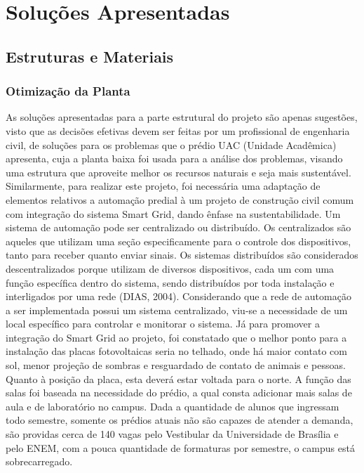\part{Soluções Apresentadas}
\label{sol}
\chapter[Estruturas e Materiais]{Estruturas e Materiais}

\section{Otimização da Planta}

As soluções apresentadas para a parte estrutural do projeto são apenas sugestões, visto que as decisões efetivas devem ser feitas por um profissional de engenharia civil, de soluções para os problemas que o prédio UAC (Unidade Acadêmica) apresenta, cuja a planta baixa foi usada para a análise dos problemas, visando uma estrutura que aproveite melhor os recursos naturais e seja mais sustentável.
Similarmente, para realizar este projeto, foi necessária uma adaptação de elementos relativos a automação predial à um projeto de construção civil comum com integração do sistema Smart Grid, dando ênfase na sustentabilidade. Um sistema de automação pode ser centralizado ou distribuído. Os centralizados são aqueles que utilizam uma seção especificamente para o controle dos dispositivos, tanto para receber quanto enviar sinais. Os sistemas distribuídos são considerados descentralizados porque utilizam de diversos dispositivos, cada um com uma função específica dentro do sistema, sendo distribuídos por toda instalação e interligados por uma rede (DIAS, 2004).
Considerando que a rede de automação a ser implementada possui um sistema centralizado, viu-se a necessidade de um local específico para controlar e monitorar o sistema. Já para promover a integração do Smart Grid ao projeto, foi constatado que o melhor ponto para a instalação das placas fotovoltaicas seria no telhado, onde há maior contato com sol, menor projeção de sombras e resguardado de contato de animais e pessoas. Quanto à posição da placa, esta deverá estar voltada para o norte.
A função das salas foi baseada na necessidade do prédio, a qual consta adicionar mais salas de aula e de laboratório no campus. Dada a quantidade de alunos que ingressam todo semestre, somente os prédios atuais não são capazes de atender a demanda, são providas cerca de 140 vagas pelo Vestibular da Universidade de Brasília e pelo ENEM, com a pouca quantidade de formaturas por semestre, o campus está sobrecarregado.

